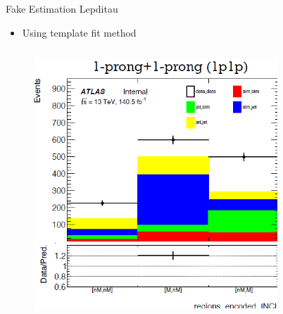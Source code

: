 \begin{frame}{Fake Estimation Lepditau}
    \begin{itemize}
        \item Using template fit method
    \end{itemize}
    \begin{columns}
        \begin{column}{0.5\textwidth}
            \begin{figure}
                \centering
                \includegraphics[width=\textwidth]{oleh_1}
            \end{figure}
        \end{column}
        \begin{column}{0.5\textwidth}
            \begin{figure}
                \centering

\end{figure}
\end{column}
\end{columns}
\end{frame}
